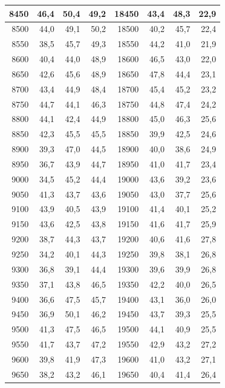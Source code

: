 \begin{small}
\begin{longtable}{|r|r|r|r|r|r|r|r|}
8450 & 46,4 & 50,4 & 49,2 & 18450 & 43,4 & 48,3 & 22,9 \\ \hline
8500 & 44,0 & 49,1 & 50,2 & 18500 & 40,2 & 45,7 & 22,4 \\ \hline
8550 & 38,5 & 45,7 & 49,3 & 18550 & 44,2 & 41,0 & 21,9 \\ \hline
8600 & 40,4 & 44,0 & 48,9 & 18600 & 46,5 & 43,0 & 22,0 \\ \hline
8650 & 42,6 & 45,6 & 48,9 & 18650 & 47,8 & 44,4 & 23,1 \\ \hline
8700 & 43,4 & 44,9 & 48,4 & 18700 & 45,4 & 45,2 & 23,2 \\ \hline
8750 & 44,7 & 44,1 & 46,3 & 18750 & 44,8 & 47,4 & 24,2 \\ \hline
8800 & 44,1 & 42,4 & 44,9 & 18800 & 45,0 & 46,3 & 25,6 \\ \hline
8850 & 42,3 & 45,5 & 45,5 & 18850 & 39,9 & 42,5 & 24,6 \\ \hline
8900 & 39,3 & 47,0 & 44,5 & 18900 & 40,0 & 38,6 & 24,9 \\ \hline
8950 & 36,7 & 43,9 & 44,7 & 18950 & 41,0 & 41,7 & 23,4 \\ \hline
9000 & 34,5 & 45,2 & 44,4 & 19000 & 43,6 & 39,2 & 23,6 \\ \hline
9050 & 41,3 & 43,7 & 43,6 & 19050 & 43,0 & 37,7 & 25,6 \\ \hline
9100 & 43,9 & 40,5 & 43,9 & 19100 & 41,4 & 40,1 & 25,2 \\ \hline
9150 & 43,6 & 42,5 & 43,8 & 19150 & 41,6 & 41,7 & 25,9 \\ \hline
9200 & 38,7 & 44,3 & 43,7 & 19200 & 40,6 & 41,6 & 27,8 \\ \hline
9250 & 34,2 & 40,1 & 44,3 & 19250 & 39,8 & 38,1 & 26,8 \\ \hline
9300 & 36,8 & 39,1 & 44,4 & 19300 & 39,6 & 39,9 & 26,8 \\ \hline
9350 & 37,1 & 43,8 & 46,5 & 19350 & 42,2 & 40,0 & 26,5 \\ \hline
9400 & 36,6 & 47,5 & 45,7 & 19400 & 43,1 & 36,0 & 26,0 \\ \hline
9450 & 36,9 & 50,1 & 46,2 & 19450 & 43,7 & 39,3 & 25,5 \\ \hline
9500 & 41,3 & 47,5 & 46,5 & 19500 & 44,1 & 40,9 & 25,5 \\ \hline
9550 & 41,7 & 43,7 & 47,2 & 19550 & 42,9 & 43,2 & 27,2 \\ \hline
9600 & 39,8 & 41,9 & 47,3 & 19600 & 41,0 & 43,2 & 27,1 \\ \hline
9650 & 38,2 & 43,2 & 46,1 & 19650 & 40,4 & 41,4 & 26,4 \\ \hline

\end{longtable}
\end{small}
